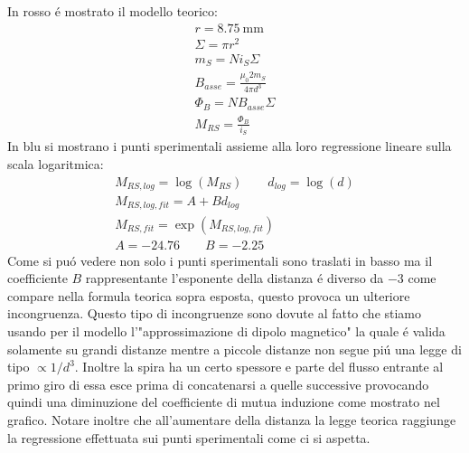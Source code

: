 In rosso \'e mostrato il modello teorico:
\begin{gather}
	r=8.75\ \si{\milli\meter} \\
	\Sigma = \pi r^2 \\
	m_S=N i_S \Sigma \\
	B_{asse}=\frac{\mu_0 2 m_S}{4 \pi d^3} \\
	\Phi_B = N B_{asse} \Sigma \\
	M_{RS} = \frac{\Phi_B}{i_S}
\end{gather}
In blu si mostrano i punti sperimentali assieme alla loro regressione lineare sulla scala logaritmica:
\begin{gather}
	M_{RS,log}=\log (M_{RS}) \qquad d_{log}=\log (d)\\
	M_{RS,log,fit}=A+B d_{log} \\
	M_{RS,fit} = \exp (M_{RS,log,fit}) \\
	A=-24.76 \qquad B=-2.25
\end{gather}
Come si pu\'o vedere non solo i punti sperimentali sono traslati in basso ma il coefficiente $B$ rappresentante l'esponente della distanza \'e diverso da $-3$ come compare nella formula teorica sopra esposta, questo provoca un ulteriore incongruenza. Questo tipo di incongruenze sono dovute al fatto che stiamo usando per il modello l'"approssimazione di dipolo magnetico" la quale \'e valida solamente su grandi distanze mentre a piccole distanze non segue pi\'u una legge di tipo $\propto 1/d^3$. Inoltre la spira ha un certo spessore e parte del flusso entrante al primo giro di essa esce prima di concatenarsi a quelle successive provocando quindi una diminuzione del coefficiente di mutua induzione come mostrato nel grafico. Notare inoltre che all'aumentare della distanza la legge teorica raggiunge la regressione effettuata sui punti sperimentali come ci si aspetta.\\